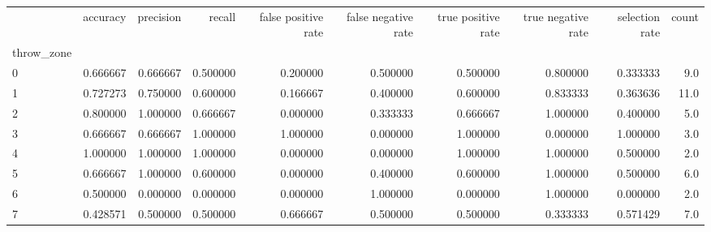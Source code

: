 \begin{tabular}{lrrrrrrrrr}
\toprule
{} &  accuracy &  precision &    recall &  false positive rate &  false negative rate &  true positive rate &  true negative rate &  selection rate &  count \\
throw\_zone &           &            &           &                      &                      &                     &                     &                 &        \\
\midrule
0          &  0.666667 &   0.666667 &  0.500000 &             0.200000 &             0.500000 &            0.500000 &            0.800000 &        0.333333 &    9.0 \\
1          &  0.727273 &   0.750000 &  0.600000 &             0.166667 &             0.400000 &            0.600000 &            0.833333 &        0.363636 &   11.0 \\
2          &  0.800000 &   1.000000 &  0.666667 &             0.000000 &             0.333333 &            0.666667 &            1.000000 &        0.400000 &    5.0 \\
3          &  0.666667 &   0.666667 &  1.000000 &             1.000000 &             0.000000 &            1.000000 &            0.000000 &        1.000000 &    3.0 \\
4          &  1.000000 &   1.000000 &  1.000000 &             0.000000 &             0.000000 &            1.000000 &            1.000000 &        0.500000 &    2.0 \\
5          &  0.666667 &   1.000000 &  0.600000 &             0.000000 &             0.400000 &            0.600000 &            1.000000 &        0.500000 &    6.0 \\
6          &  0.500000 &   0.000000 &  0.000000 &             0.000000 &             1.000000 &            0.000000 &            1.000000 &        0.000000 &    2.0 \\
7          &  0.428571 &   0.500000 &  0.500000 &             0.666667 &             0.500000 &            0.500000 &            0.333333 &        0.571429 &    7.0 \\
\bottomrule
\end{tabular}
